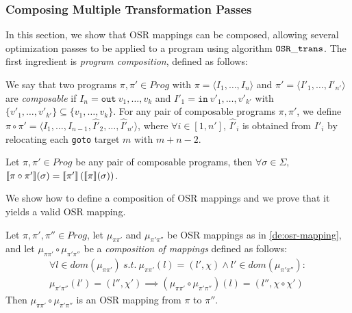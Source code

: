 \subsubsection{Composing Multiple Transformation Passes}
\label{ss:trans-compose}

In this section, we show that OSR mappings can be composed, allowing several optimization passes to be applied to a program using algorithm ${\tt OSR\_trans}$. The first ingredient is {\em program composition}, defined as follows:

\begin{definition}
We say that two programs $\pi,\pi'\in Prog$ with $\pi=\langle I_1,\ldots,I_n\rangle$ and $\pi'=\langle I'_1,\ldots,I'_{n'}\rangle$ are {\em composable} if $I_n=\texttt{out}~v_1,\ldots,v_k$ and $I'_1=\texttt{in}~v'_1,\ldots,v'_{k'}$ with $\{v'_1,\ldots,v'_{k'}\}\subseteq\{v_1,\ldots,v_k\}$. For any pair of composable programs $\pi,\pi'$, we define $\pi\circ\pi'=\langle I_1,\ldots,I_{n-1},\hat{I'}_2,\ldots,\hat{I'}_{n'}\rangle$, where $\forall i\in[1,n']$, $\hat{I'}_i$ is obtained from $I'_i$ by relocating each {\tt goto} target $m$ with $m+n-2$.
\iffalse
where $\chi\circ\chi'=\chi\setminus\{{\tt out \ldots}\}\cdot\chi'\left[
\begin{tiny}
\begin{array}{l}
\texttt{goto}~m\mapsto \\
\texttt{goto}~m+|\chi|-2
\end{array}
\end{tiny}
\right]\setminus\{{\tt in \ldots}\}$. 
\fi
\end{definition}

\begin{lemma}
\label{le:prog-comp-sem}
Let $\pi,\pi'\in Prog$ be any pair of composable programs, then $\forall\sigma\in\Sigma,$ $[\![\pi\circ\pi']\!](\sigma)=[\![\pi']\!]\left([\![\pi]\!](\sigma)\right)$.
\end{lemma}

\noindent We show how to define a composition of OSR mappings and we prove that it yields a valid OSR mapping.

\begin{lemma}
\label{le:osr-mapping-comp}
Let $\pi,\pi',\pi''\in Prog$, let $\mu_{\pi\pi'}$ and $\mu_{\pi'\pi''}$ be OSR mappings as in \mydefinition\ref{de:osr-mapping}, and let $\mu_{\pi\pi'}\circ\mu_{\pi'\pi''}$ be a {\em composition of mappings} defined as follows:
\begin{gather*}
\forall l\in dom(\mu_{\pi\pi'})~s.t.~\mu_{\pi\pi'}(l)=(l',\chi)\wedge l'\in dom(\mu_{\pi'\pi''}):\\
\mu_{\pi'\pi''}(l')=(l'',\chi')\implies(\mu_{\pi\pi'}\circ\mu_{\pi'\pi''})(l)=(l'',\chi\circ\chi')
\end{gather*}
Then $\mu_{\pi\pi'}\circ\mu_{\pi'\pi''}$ is an OSR mapping from $\pi$ to $\pi''$.
\end{lemma}

